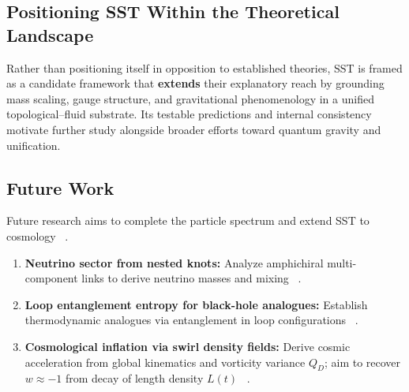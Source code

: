 \documentclass[10pt,reprint,aps,onecolumn,nofootinbib]{revtex4-2}
\begin{document}
    \subsection*{Positioning SST Within the Theoretical Landscape}
        Rather than positioning itself in opposition to established theories, SST is framed as a candidate framework that \textbf{extends} their explanatory reach by grounding mass scaling, gauge structure, and gravitational phenomenology in a unified topological–fluid substrate. Its testable predictions and internal consistency motivate further study alongside broader efforts toward quantum gravity and unification.

    \subsection*{Future Work}
        Future research aims to complete the particle spectrum and extend SST to cosmology~ \cite{sstCanon}.
        \begin{enumerate}
            \item \textbf{Neutrino sector from nested knots:} Analyze amphichiral multi-component links to derive neutrino masses and mixing~ \cite{sstLagrangian}.
            \item \textbf{Loop entanglement entropy for black-hole analogues:} Establish thermodynamic analogues via entanglement in loop configurations~ \cite{sstCanon}.
            \item \textbf{Cosmological inflation via swirl density fields:} Derive cosmic acceleration from global kinematics and vorticity variance $Q_D$; aim to recover $w \approx -1$ from decay of length density $L(t)$~ \cite{sstCanon}.
        \end{enumerate}
\end{document}
